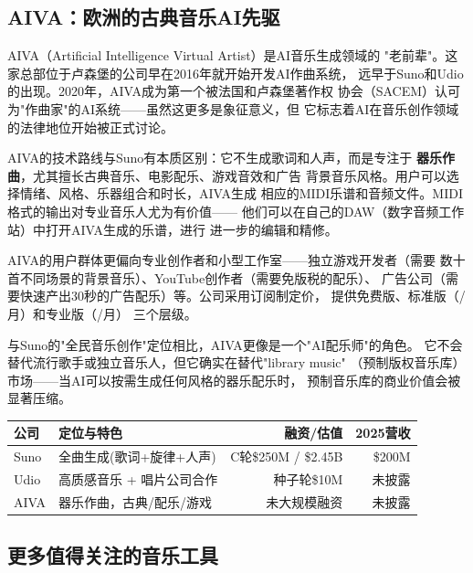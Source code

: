 \subsection{AIVA：欧洲的古典音乐AI先驱}
\label{subsec:aiva}

AIVA（Artificial Intelligence Virtual Artist）是AI音乐生成领域的
"老前辈"。这家总部位于卢森堡的公司早在2016年就开始开发AI作曲系统，
远早于Suno和Udio的出现。2020年，AIVA成为第一个被法国和卢森堡著作权
协会（SACEM）认可为"作曲家"的AI系统——虽然这更多是象征意义，但
它标志着AI在音乐创作领域的法律地位开始被正式讨论。

AIVA的技术路线与Suno有本质区别：它不生成歌词和人声，而是专注于
\textbf{器乐作曲}，尤其擅长古典音乐、电影配乐、游戏音效和广告
背景音乐风格。用户可以选择情绪、风格、乐器组合和时长，AIVA生成
相应的MIDI乐谱和音频文件。MIDI格式的输出对专业音乐人尤为有价值——
他们可以在自己的DAW（数字音频工作站）中打开AIVA生成的乐谱，进行
进一步的编辑和精修。

AIVA的用户群体更偏向专业创作者和小型工作室——独立游戏开发者（需要
数十首不同场景的背景音乐）、YouTube创作者（需要免版税的配乐）、
广告公司（需要快速产出30秒的广告配乐）等。公司采用订阅制定价，
提供免费版、标准版（/月）和专业版（/月）
三个层级。

与Suno的"全民音乐创作"定位相比，AIVA更像是一个"AI配乐师"的角色。
它不会替代流行歌手或独立音乐人，但它确实在替代"library music"
（预制版权音乐库）市场——当AI可以按需生成任何风格的器乐配乐时，
预制音乐库的商业价值会被显著压缩。

\begin{keybox}
\small
\begin{tabularx}{\textwidth}{l X r r}
\toprule
\rowcolor{figLightGray}
\textbf{公司} & \textbf{定位与特色} & \textbf{融资/估值} & \textbf{2025营收} \\
\midrule
Suno    & 全曲生成(歌词+旋律+人声)    & C轮\$250M / \$2.45B  & \$200M \\
Udio    & 高质感音乐 + 唱片公司合作   & 种子轮\$10M          & 未披露 \\
AIVA    & 器乐作曲，古典/配乐/游戏    & 未大规模融资          & 未披露 \\
\bottomrule
\end{tabularx}
\end{keybox}

\subsection{更多值得关注的音乐工具}

